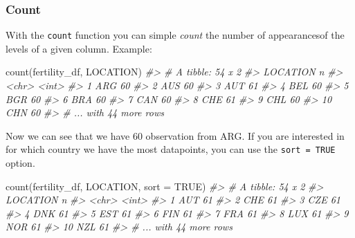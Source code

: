 \documentclass[
]{article}
\newenvironment{Shaded}{\begin{snugshade}}{\end{snugshade}}
\newcommand{\AttributeTok}[1]{\textcolor[rgb]{0.77,0.63,0.00}{#1}}
\newcommand{\CommentTok}[1]{\textcolor[rgb]{0.56,0.35,0.01}{\textit{#1}}}
\newcommand{\ConstantTok}[1]{\textcolor[rgb]{0.00,0.00,0.00}{#1}}
\newcommand{\FunctionTok}[1]{\textcolor[rgb]{0.00,0.00,0.00}{#1}}
\newcommand{\NormalTok}[1]{#1}
\begin{document}
\hypertarget{count}{%
\subsubsection{Count}\label{count}}

With the \texttt{count} function you can simple \emph{count} the number of appearancesof the levels of a given column. Example:

\begin{Shaded}
\begin{Highlighting}[]
\FunctionTok{count}\NormalTok{(fertility\_df, LOCATION)}
\CommentTok{\#\textgreater{} \# A tibble: 54 x 2}
\CommentTok{\#\textgreater{}    LOCATION     n}
\CommentTok{\#\textgreater{}    \textless{}chr\textgreater{}    \textless{}int\textgreater{}}
\CommentTok{\#\textgreater{}  1 ARG         60}
\CommentTok{\#\textgreater{}  2 AUS         60}
\CommentTok{\#\textgreater{}  3 AUT         61}
\CommentTok{\#\textgreater{}  4 BEL         60}
\CommentTok{\#\textgreater{}  5 BGR         60}
\CommentTok{\#\textgreater{}  6 BRA         60}
\CommentTok{\#\textgreater{}  7 CAN         60}
\CommentTok{\#\textgreater{}  8 CHE         61}
\CommentTok{\#\textgreater{}  9 CHL         60}
\CommentTok{\#\textgreater{} 10 CHN         60}
\CommentTok{\#\textgreater{} \# ... with 44 more rows}
\end{Highlighting}
\end{Shaded}

Now we can see that we have 60 observation from ARG. If you are interested in for which country we have the most datapoints, you can use the \texttt{sort\ =\ TRUE} option.

\begin{Shaded}
\begin{Highlighting}[]
\FunctionTok{count}\NormalTok{(fertility\_df, LOCATION, }\AttributeTok{sort =} \ConstantTok{TRUE}\NormalTok{)}
\CommentTok{\#\textgreater{} \# A tibble: 54 x 2}
\CommentTok{\#\textgreater{}    LOCATION     n}
\CommentTok{\#\textgreater{}    \textless{}chr\textgreater{}    \textless{}int\textgreater{}}
\CommentTok{\#\textgreater{}  1 AUT         61}
\CommentTok{\#\textgreater{}  2 CHE         61}
\CommentTok{\#\textgreater{}  3 CZE         61}
\CommentTok{\#\textgreater{}  4 DNK         61}
\CommentTok{\#\textgreater{}  5 EST         61}
\CommentTok{\#\textgreater{}  6 FIN         61}
\CommentTok{\#\textgreater{}  7 FRA         61}
\CommentTok{\#\textgreater{}  8 LUX         61}
\CommentTok{\#\textgreater{}  9 NOR         61}
\CommentTok{\#\textgreater{} 10 NZL         61}
\CommentTok{\#\textgreater{} \# ... with 44 more rows}
\end{Highlighting}
\end{Shaded}
\end{document}
